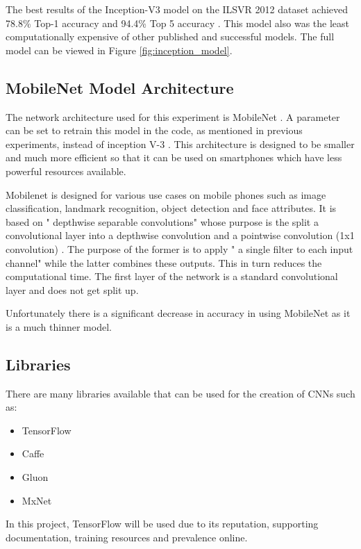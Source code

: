 The best results of the Inception-V3 model on the ILSVR 2012 dataset achieved 78.8\% Top-1 accuracy and 94.4\% Top 5 accuracy \parencite{rethinkingInception}.
This model also was the least computationally expensive of other published and successful models.
The full model can be viewed in Figure \ref{fig:inception_model}.

\clearpage

\tocless\subsection{MobileNet Model Architecture}
The network architecture used for this experiment is MobileNet \parencite{mobilenet}.
A parameter can be set to retrain this model in the code, as mentioned in previous experiments, instead of inception V-3 \parencite{retrainInception}. 
This architecture is designed to be smaller and much more efficient so that
it can be used on smartphones which have less powerful resources available.

Mobilenet is designed for various use cases on mobile phones such as image classification, landmark recognition, object detection and face attributes.
It is based on " depthwise separable convolutions" whose purpose is the split a convolutional layer into a depthwise convolution and a pointwise convolution (1x1 convolution) \parencite{mobilenet}.
The purpose of the former is to apply " a single filter to each input channel" \parencite{mobilenet} while the latter combines these outputs.
This in turn reduces the computational time.
The first layer of the network is a standard convolutional layer and does not get split up.

Unfortunately there is a significant decrease in accuracy in using MobileNet as it is a much thinner model.

\tocless\subsection{Libraries}
There are many libraries available that can be used for the creation of CNNs such as:
\begin{itemize}
    \item{TensorFlow}
    \item{Caffe}
    \item{Gluon}
    \item{MxNet}
\end{itemize}
In this project, TensorFlow will be used due to its reputation, supporting documentation, training resources and prevalence online.

